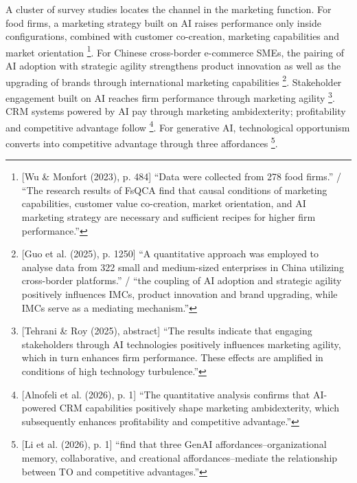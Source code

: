A cluster of survey studies locates the channel in the marketing function. For food firms, a marketing strategy built on AI raises performance only inside configurations, combined with customer co-creation, marketing capabilities and market orientation \parencite[p.~484]{wu2023role}\footnote{[Wu \& Monfort (2023), p. 484] ``Data were collected from 278 food firms.'' / ``The research results of FsQCA find that causal conditions of marketing capabilities, customer value co-creation, market orientation, and AI marketing strategy are necessary and sufficient recipes for higher firm performance.''}. For Chinese cross-border e-commerce SMEs, the pairing of AI adoption with strategic agility strengthens product innovation as well as the upgrading of brands through international marketing capabilities \parencite[p.~1250]{guo2025cross}\footnote{[Guo et al. (2025), p. 1250] ``A quantitative approach was employed to analyse data from 322 small and medium-sized enterprises in China utilizing cross-border platforms.'' / ``the coupling of AI adoption and strategic agility positively influences IMCs, product innovation and brand upgrading, while IMCs serve as a mediating mechanism.''}. Stakeholder engagement built on AI reaches firm performance through marketing agility \parencite[abstract]{tehrani2025navigating}\footnote{[Tehrani \& Roy (2025), abstract] ``The results indicate that engaging stakeholders through AI technologies positively influences marketing agility, which in turn enhances firm performance. These effects are amplified in conditions of high technology turbulence.''}. CRM systems powered by AI pay through marketing ambidexterity; profitability and competitive advantage follow \parencite[p.~1]{alnofeli2026powered}\footnote{[Alnofeli et al. (2026), p. 1] ``The quantitative analysis confirms that AI-powered CRM capabilities positively shape marketing ambidexterity, which subsequently enhances profitability and competitive advantage.''}. For generative AI, technological opportunism converts into competitive advantage through three affordances \parencite[p.~1]{li2026opportunity}\footnote{[Li et al. (2026), p. 1] ``find that three GenAI affordances--organizational memory, collaborative, and creational affordances--mediate the relationship between TO and competitive advantages.''}.

